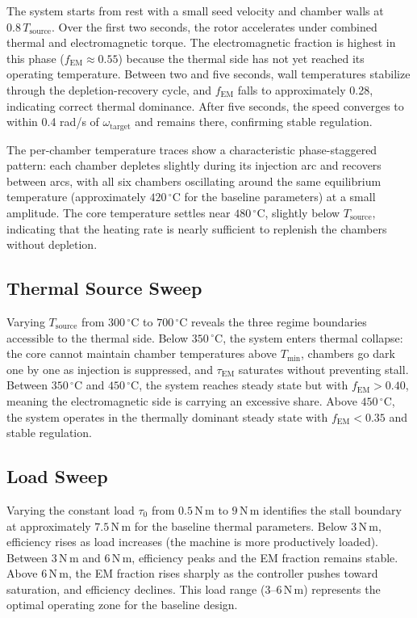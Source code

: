 \documentclass[11pt, a4paper]{article}
\theoremstyle{plain}
\theoremstyle{definition}
\newcommand{\Tsource}{T_{\mathrm{source}}}
\newcommand{\tauEM}{\tau_{\mathrm{EM}}}
\newcommand{\om}{\omega}
\begin{document}
The system starts from rest with a small seed velocity and chamber walls at $0.8\,\Tsource$. Over the first two seconds, the rotor accelerates under combined thermal and electromagnetic torque. The electromagnetic fraction is highest in this phase ($f_{\mathrm{EM}} \approx 0.55$) because the thermal side has not yet reached its operating temperature. Between two and five seconds, wall temperatures stabilize through the depletion-recovery cycle, and $f_{\mathrm{EM}}$ falls to approximately 0.28, indicating correct thermal dominance. After five seconds, the speed converges to within 0.4 rad/s of $\om_{\mathrm{target}}$ and remains there, confirming stable regulation.

The per-chamber temperature traces show a characteristic phase-staggered pattern: each chamber depletes slightly during its injection arc and recovers between arcs, with all six chambers oscillating around the same equilibrium temperature (approximately $420\,{}^\circ\mathrm{C}$ for the baseline parameters) at a small amplitude. The core temperature settles near $480\,{}^\circ\mathrm{C}$, slightly below $\Tsource$, indicating that the heating rate is nearly sufficient to replenish the chambers without depletion.

\subsection{Thermal Source Sweep}

Varying $\Tsource$ from $300\,{}^\circ\mathrm{C}$ to $700\,{}^\circ\mathrm{C}$ reveals the three regime boundaries accessible to the thermal side. Below $350\,{}^\circ\mathrm{C}$, the system enters thermal collapse: the core cannot maintain chamber temperatures above $T_{\mathrm{min}}$, chambers go dark one by one as injection is suppressed, and $\tauEM$ saturates without preventing stall. Between $350\,{}^\circ\mathrm{C}$ and $450\,{}^\circ\mathrm{C}$, the system reaches steady state but with $f_{\mathrm{EM}} > 0.40$, meaning the electromagnetic side is carrying an excessive share. Above $450\,{}^\circ\mathrm{C}$, the system operates in the thermally dominant steady state with $f_{\mathrm{EM}} < 0.35$ and stable regulation.

\subsection{Load Sweep}

Varying the constant load $\tau_0$ from $0.5\,\mathrm{N\,m}$ to $9\,\mathrm{N\,m}$ identifies the stall boundary at approximately $7.5\,\mathrm{N\,m}$ for the baseline thermal parameters. Below $3\,\mathrm{N\,m}$, efficiency rises as load increases (the machine is more productively loaded). Between $3\,\mathrm{N\,m}$ and $6\,\mathrm{N\,m}$, efficiency peaks and the EM fraction remains stable. Above $6\,\mathrm{N\,m}$, the EM fraction rises sharply as the controller pushes toward saturation, and efficiency declines. This load range ($3\text{--}6\,\mathrm{N\,m}$) represents the optimal operating zone for the baseline design.
\end{document}
